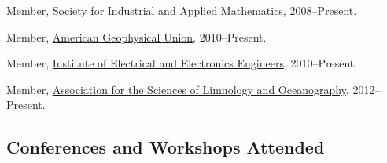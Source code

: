 \documentclass[10pt,letterpaper]{article}
\renewenvironment{itemize}{
  \begin{list}{}{
    \setlength{\leftmargin}{1.5em}
    \setlength{\itemsep}{0.25em}
    \setlength{\parskip}{0pt}
    \setlength{\parsep}{0.25em}
  }
}{
  \end{list}
}
\begin{document}
\begin{itemize}

\item Member, \href{http://www.siam.org/}{Society for Industrial and Applied Mathematics},
  2008--Present.

\item Member, \href{http://www.agu.org/}{American Geophysical Union},
  2010--Present.

\item Member, \href{http://www.ieee.org/}{Institute of Electrical and Electronics Engineers},
  2010--Present.

\item Member, \href{http://www.aslo.org/}{Association for the Sciences of Limnology and Oceanography},
  2012--Present.

%

\end{itemize}

\subsection*{Conferences and Workshops Attended}
\end{document}
